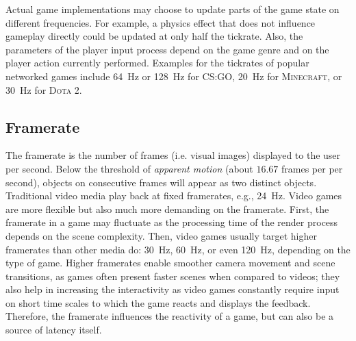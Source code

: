 
Actual game implementations may choose to update parts of the game state on different frequencies. For example, a physics effect that does not influence gameplay directly could be updated at only half the tickrate. Also, the parameters of the player input process depend on the game genre and on the player action currently performed. Examples for the tickrates of popular networked games %
include \SI{64}{\hertz} or \SI{128}{\hertz} for \textsc{CS:GO}, \SI{20}{\hertz} for \textsc{Minecraft}, or \SI{30}{\hertz} for \textsc{Dota 2}.


\subsection{Framerate}
\label{sec:framerate}

The framerate is the number of frames (i.e. visual images) displayed to the user per second. Below the threshold of \textit{apparent motion} (about $16.67$ frames per per second), objects on consecutive frames will appear as two distinct objects. Traditional video media play back at fixed framerates, e.g., \SI{24}{\hertz}. Video games are more flexible but also much more demanding on the framerate. First, the framerate in a game may fluctuate as the processing time of the render process depends on the scene complexity. Then, video games usually target higher framerates than other media do: \SI{30}{\hertz}, \SI{60}{\hertz}, or even \SI{120}{\hertz}, depending on the type of game. Higher framerates enable smoother camera movement and scene transitions, as games often present faster scenes when compared to videos; they also help in increasing the interactivity as video games constantly require input on short time scales to which the game reacts and displays the feedback. Therefore, the framerate influences the reactivity of a game, but can also be a source of latency itself.


